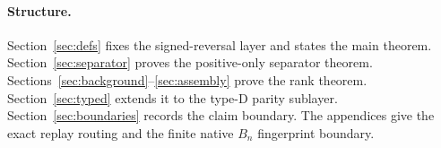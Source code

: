 \paragraph{Structure.}
Section~\ref{sec:defs} fixes the signed-reversal layer and states the main theorem.  Section~\ref{sec:separator} proves the positive-only separator theorem.  Sections~\ref{sec:background}--\ref{sec:assembly} prove the rank theorem.  Section~\ref{sec:typed} extends it to the type-D parity sublayer.  Section~\ref{sec:boundaries} records the claim boundary.  The appendices give the exact replay routing and the finite native $B_n$ fingerprint boundary.
